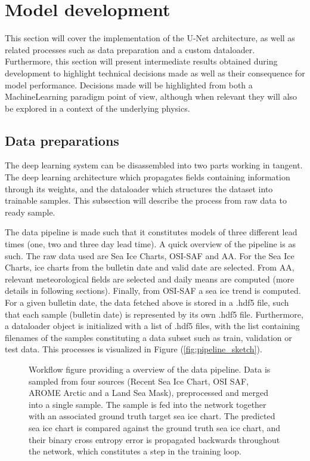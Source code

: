 \documentclass[../main/thesis]{subfiles}
\begin{document}
\section{Model development}
\label{sec:developing a unet}
This section will cover the implementation of the U-Net architecture, as well as related processes such as data preparation and a custom dataloader. Furthermore, this section will present intermediate results obtained during development to highlight technical decisions made as well as their consequence for model performance. Decisions made will be highlighted from both a MachineLearning paradigm point of view, although when relevant they will also be explored in a context of the underlying physics.


\subsection{Data preparations}
The deep learning system can be disassembled into two parts working in tangent. The deep learning architecture which propagates fields containing information through its weights, and the dataloader which structures the dataset into trainable samples. This subsection will describe the process from raw data to ready sample.

The data pipeline is made such that it constitutes models of three different lead times (one, two and three day lead time). A quick overview of the pipeline is as such. The raw data used are Sea Ice Charts, OSI-SAF and AA. For the Sea Ice Charts, ice charts from the bulletin date and valid date are selected. From AA, relevant meteorological fields are selected and daily means are computed (more details in following sections). Finally, from OSI-SAF a sea ice trend is computed. For a given bulletin date, the data fetched above is stored in a .hdf5 file, such that each sample (bulletin date) is represented by its own .hdf5 file. Furthermore, a dataloader object is initialized with a list of .hdf5 files, with the list containing filenames of the samples constituting a data subset such as train, validation or test data. This processes is visualized in Figure (\ref{fig:pipeline_sketch}).

\begin{figure}
    \centering
    
    \caption{\label{fig:data_pipeline} Workflow figure providing a overview of the data pipeline. Data is sampled from four sources (Recent Sea Ice Chart, OSI SAF, AROME Arctic and a Land Sea Mask), preprocessed and merged into a single sample. The sample is fed into the network  together with an associated ground truth target sea ice chart. The predicted sea ice chart is compared against the ground truth sea ice chart, and their binary cross entropy error is propagated backwards throughout the network, which constitutes a step in the training loop.}
\end{figure}
    
\end{document}

